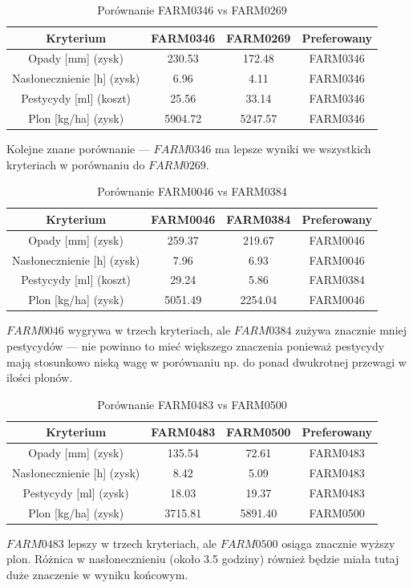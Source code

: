 \documentclass[11pt]{article}
\begin{document}
\begin{table}[H]
\centering
\begin{tabular}{|c||c|c|c|}
\hline
\textbf{Kryterium} & \textbf{FARM0346} & \textbf{FARM0269} & \textbf{Preferowany} \\
\hline
Opady [mm] (zysk)           & 230.53 & 172.48 & FARM0346 \\ \hline
Nasłonecznienie [h] (zysk) & 6.96   & 4.11   & FARM0346 \\ \hline
Pestycydy [ml] (koszt)      & 25.56  & 33.14  & FARM0346 \\ \hline
Plon [kg/ha] (zysk)        & 5904.72& 5247.57& FARM0346 \\
\hline
\end{tabular}
\caption{Porównanie FARM0346 vs FARM0269}
\end{table}
Kolejne znane porównanie --- $FARM0346$ ma lepsze wyniki we wszystkich kryteriach w porównaniu do $FARM0269$.

\begin{table}[H]
\centering
\begin{tabular}{|c||c|c|c|}
\hline
\textbf{Kryterium} & \textbf{FARM0046} & \textbf{FARM0384} & \textbf{Preferowany} \\
\hline
Opady [mm] (zysk)           & 259.37 & 219.67 & FARM0046 \\ \hline
Nasłonecznienie [h] (zysk) & 7.96   & 6.93   & FARM0046 \\ \hline
Pestycydy [ml] (koszt)      & 29.24  & 5.86   & FARM0384 \\ \hline
Plon [kg/ha] (zysk)        & 5051.49& 2254.04& FARM0046 \\
\hline
\end{tabular}
\caption{Porównanie FARM0046 vs FARM0384}
\end{table}
$FARM0046$ wygrywa w trzech kryteriach, ale $FARM0384$ zużywa znacznie mniej pestycydów --- nie powinno to mieć większego znaczenia ponieważ pestycydy mają stosunkowo niską wagę w porównaniu np. do ponad dwukrotnej przewagi w ilości plonów.

\begin{table}[H]
\centering
\begin{tabular}{|c||c|c|c|}
\hline
\textbf{Kryterium} & \textbf{FARM0483} & \textbf{FARM0500} & \textbf{Preferowany} \\
\hline
Opady [mm] (zysk)           & 135.54 & 72.61  & FARM0483 \\ \hline
Nasłonecznienie [h] (zysk) & 8.42   & 5.09   & FARM0483 \\ \hline
Pestycydy [ml] (zysk)      & 18.03  & 19.37  & FARM0483 \\ \hline
Plon [kg/ha] (zysk)        & 3715.81& 5891.40& FARM0500 \\
\hline
\end{tabular}
\caption{Porównanie FARM0483 vs FARM0500}
\end{table}
$FARM0483$ lepszy w trzech kryteriach, ale $FARM0500$ osiąga znacznie wyższy plon. Różnica w nasłonecznieniu (około 3.5 godziny) również będzie miała tutaj duże znaczenie w wyniku końcowym.
\end{document}
